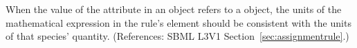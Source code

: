 When the value of the attribute  in an \AssignmentRule
object refers to a \Species object, the units of the mathematical
expression in the rule's  element should be consistent with the
units of that species' quantity.  (References: SBML L3V1
Section~\ref{sec:assignmentrule}.)

